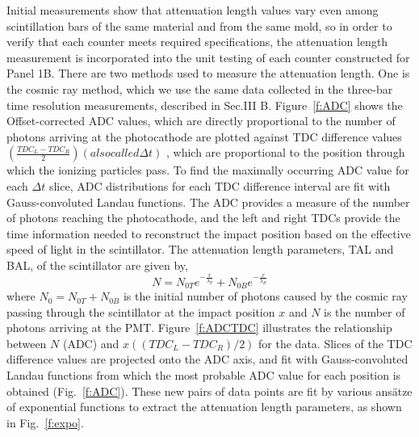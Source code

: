 Initial measurements show that attenuation length values vary even among scintillation
bars of the same material and from the same mold, so in order to verify that
each counter meets required specifications, the attenuation length measurement is
incorporated into the unit testing of each counter constructed for Panel 1B. There are two methods used to measure the attenuation length. One is the cosmic ray method, which we use the same data collected in the three-bar time resolution measurements, described in Sec.III B. Figure~\ref{f:ADC} shows the Offset-corrected ADC values, which are directly proportional to the number of photons arriving at the photocathode are plotted against TDC difference values $(\frac{TDC_{L}-TDC_{R}}{2})(also called \Delta t)$ , which are proportional to the position through which the ionizing particles pass. To find the maximally occurring ADC value for each $\Delta t$ slice, ADC distributions for each TDC difference interval are fit with Gauss-convoluted Landau functions. The ADC provides a measure of the number of photons reaching the photocathode, and the left and right TDCs provide the time information needed to reconstruct the impact position based on the effective speed of light in the scintillator. The attenuation length parameters, TAL and BAL, of the scintillator are given by,
\begin{equation}
N=N_{0T}e^{-\frac{x}{\lambda_{T}}}+N_{0B}e^{-\frac{x}{\lambda_{B}}}
\label{eq:2}
\end{equation}
where $N_{0} = N_{0T} + N_{0B}$ is the initial number of photons caused by the cosmic ray passing
through the scintillator at the impact position $x$ and $N$ is the number of photons arriving
at the PMT. Figure~\ref{f:ADCTDC} illustrates the relationship between $N$ (ADC) and $x((TDC_{L}-TDC_{R})/2)$
for the data. Slices of the TDC difference values are projected onto the ADC axis, and fit
with Gauss-convoluted Landau functions from which the most probable ADC value for each
position is obtained (Fig.~\ref{f:ADC}). These new pairs of data points are fit by various ans\"{a}tze
of exponential functions to extract the attenuation length parameters, as shown in Fig.~\ref{f:expo}.
